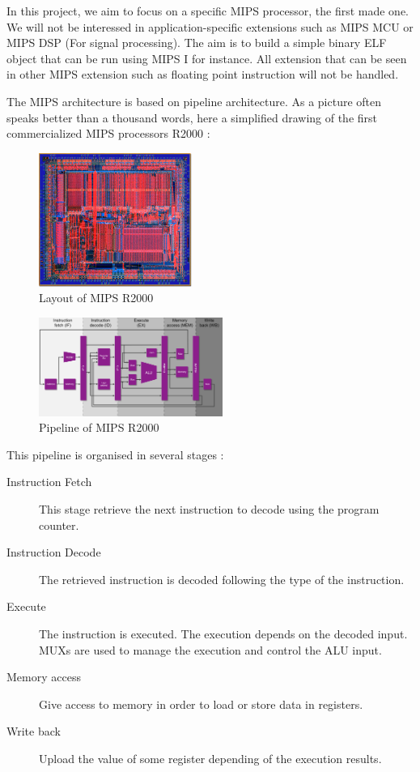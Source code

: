 \documentclass[twoside,twocolumn]{article}
\begin{document}
In this project, we aim to focus on a specific MIPS processor, the first made one. We will not be interessed in application-specific extensions such as MIPS MCU or MIPS DSP (For signal processing). The aim is to build a simple binary ELF object that can be run using MIPS I for instance. All extension that can be seen in other MIPS extension such as floating point instruction will not be handled.

The MIPS architecture is based on pipeline architecture. As a picture often speaks better than a thousand words, here a simplified drawing of the first commercialized MIPS processors R2000 :

\begin{figure}[h!]
\begin{center}
\includegraphics[width=5cm]{images/MIPS-R2000.jpg} 
\end{center}
\caption{Layout of MIPS R2000}
\label{Layout MIPS R2000}
\end{figure}

\begin{figure}[h!]
\begin{center}
\includegraphics[width=6cm]{images/MIPS-R2000-pipeline-architecture.png} 
\end{center}
\caption{Pipeline of MIPS R2000}
\label{MIPS R2000}
\end{figure}

This pipeline is organised in several stages :

\begin{description}
 \item[ Instruction Fetch ] This stage retrieve the next instruction to decode using the program counter.
 \item[ Instruction Decode ] The retrieved instruction is decoded following the type of the instruction.
 \item[ Execute ] The instruction is executed. The execution depends on the decoded input. MUXs are used to manage the execution and control the ALU input.
 \item[ Memory access ] Give access to memory in order to load or store data in registers.
 \item[ Write back ] Upload the value of some register depending of the execution results.
\end{description}
\end{document}
